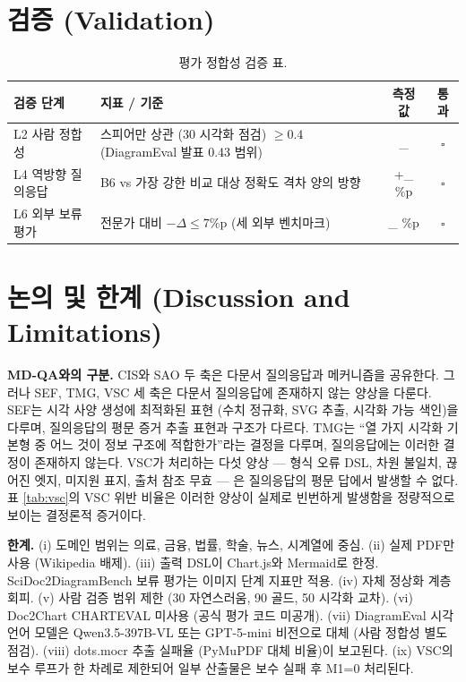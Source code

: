 \documentclass[11pt]{article}
\begin{document}
\section{검증 (Validation)}

\begin{table}[h]
\centering
\small
\begin{tabular}{ll|cc}
\toprule
검증 단계 & 지표 / 기준 & 측정값 & 통과 \\
\midrule
L2 사람 정합성 & 스피어만 상관 (30 시각화 점검) $\geq 0.4$ (DiagramEval 발표 0.43 범위) & \_ & $\square$ \\
L4 역방향 질의응답 & B6 vs 가장 강한 비교 대상 정확도 격차 양의 방향 & +\_ \%p & $\square$ \\
L6 외부 보류 평가 & 전문가 대비 $-\Delta \leq 7\%$p (세 외부 벤치마크) & \_ \%p & $\square$ \\
\bottomrule
\end{tabular}
\caption{평가 정합성 검증 표.}
\label{tab:a3}
\end{table}

\section{논의 및 한계 (Discussion and Limitations)}

\textbf{MD-QA와의 구분.} CIS와 SAO 두 축은 다문서 질의응답과 메커니즘을 공유한다. 그러나 SEF, TMG, VSC 세 축은 다문서 질의응답에 존재하지 않는 양상을 다룬다. SEF는 시각 사양 생성에 최적화된 표현 (수치 정규화, SVG 추출, 시각화 가능 색인)을 다루며, 질의응답의 평문 증거 추출 표현과 구조가 다르다. TMG는 ``열 가지 시각화 기본형 중 어느 것이 정보 구조에 적합한가''라는 결정을 다루며, 질의응답에는 이러한 결정이 존재하지 않는다. VSC가 처리하는 다섯 양상 — 형식 오류 DSL, 차원 불일치, 끊어진 엣지, 미지원 표지, 출처 참조 무효 — 은 질의응답의 평문 답에서 발생할 수 없다. 표 \ref{tab:vsc}의 VSC 위반 비율은 이러한 양상이 실제로 빈번하게 발생함을 정량적으로 보이는 결정론적 증거이다.

\textbf{한계.} (i) 도메인 범위는 의료, 금융, 법률, 학술, 뉴스, 시계열에 중심. (ii) 실제 PDF만 사용 (Wikipedia 배제). (iii) 출력 DSL이 Chart.js와 Mermaid로 한정. SciDoc2DiagramBench 보류 평가는 이미지 단계 지표만 적용. (iv) 자체 정상화 계층 회피. (v) 사람 검증 범위 제한 (30 자연스러움, 90 골드, 50 시각화 교차). (vi) Doc2Chart CHARTEVAL 미사용 (공식 평가 코드 미공개). (vii) DiagramEval 시각 언어 모델은 Qwen3.5-397B-VL 또는 GPT-5-mini 비전으로 대체 (사람 정합성 별도 점검). (viii) dots.mocr 추출 실패율 (PyMuPDF 대체 비율)이 보고된다. (ix) VSC의 보수 루프가 한 차례로 제한되어 일부 산출물은 보수 실패 후 M1=0 처리된다.
\end{document}
